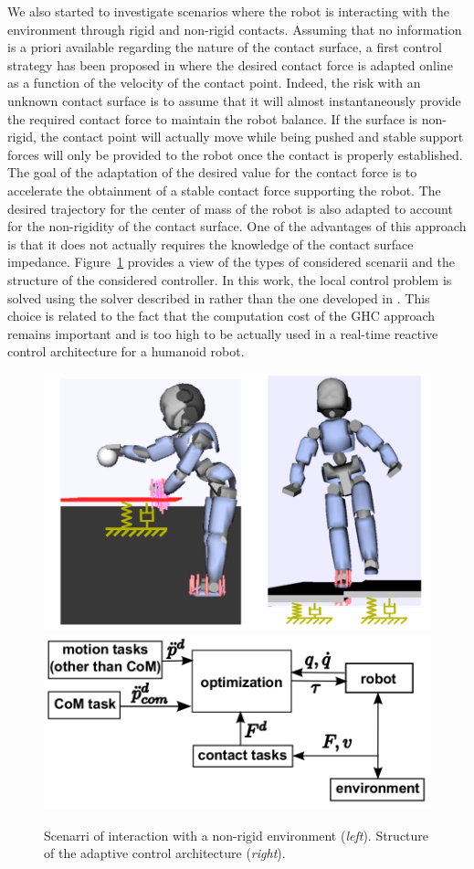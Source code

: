 \documentclass[final,5p,twocolumn]{elsarticle}
\begin{document}
We also started to investigate scenarios where the robot is interacting with the environment through rigid and non-rigid contacts. Assuming that no information is a priori available regarding the nature of the contact surface, a first control strategy has been proposed in \cite{LiuIROS2015} where the desired contact force is adapted online as a function of the velocity of the contact point. Indeed, the risk with an unknown contact surface is to assume that it will almost instantaneously provide the required contact force to maintain the robot balance. If the surface is non-rigid, the contact point will actually move while being pushed and stable support forces will only be provided to the robot once the contact is properly established. The goal of the adaptation of the desired value for the contact force is to accelerate the obtainment of a stable contact force supporting the robot. The desired trajectory for the center of mass of the robot is also adapted to account for the non-rigidity of the contact surface. One of the advantages of this approach is that it does not actually requires the knowledge of the contact surface impedance. Figure~\ref{fig:LIU_IROS_2015} provides a view of the types of considered scenarii and the structure of the considered controller. In this work, the local control problem is solved using the solver described in \cite{salini2012} rather than the one developed in \cite{liu2015}. This choice is related to the fact that the computation cost of the GHC approach remains important and is too high to be actually used in a real-time reactive control architecture for a humanoid robot.

\begin{figure}[h!]
\centering
\includegraphics[width=0.8\linewidth]{images/LIU_IROS_2015}\\\includegraphics[width=0.8\linewidth]{images/LIU_IROS_2015_bis}
\caption{Scenarri of interaction with a non-rigid environment (\textit{left}). Structure of the adaptive control architecture (\textit{right}).}
\label{fig:LIU_IROS_2015}
\end{figure}
\end{document}
